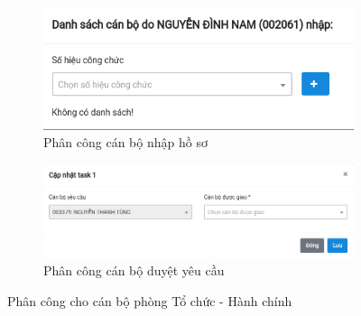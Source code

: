 \begin{figure}[H]
    \centering
    \begin{subfigure}[b]{0.4\linewidth}
        \includegraphics[width=\linewidth]{img/Screen/assignhoso.png}
        \caption{Phân công cán bộ nhập hồ sơ}
        \label{fig:assign_hoso}
    \end{subfigure}
    \begin{subfigure}[b]{0.4\linewidth}
        \includegraphics[width=\linewidth]{img/Screen/assignTask.png}
        \caption{Phân công cán bộ duyệt yêu cầu}
        \label{fig:assign_task}
    \end{subfigure}
    \caption{Phân công cho cán bộ phòng Tổ chức - Hành chính}
\end{figure}
